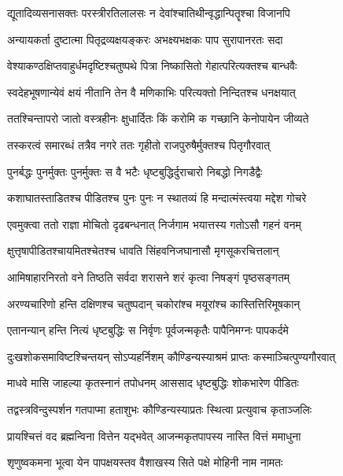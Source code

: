 {द्यूतादिव्यसनासक्तः परस्त्रीरतिलालसः}
{न देवांश्चातिथीन्वृद्धान्पितॄश्चा विजानपि} %

\twolineshloka
{अन्यायकर्ता दुष्टात्मा पितृद्रव्यक्षयङ्करः}
{अभक्ष्यभक्षकः पाप सुरापानरतः सदा} %

\twolineshloka
{वेश्याकण्ठक्षिप्तवाहुर्धमदृष्टिश्चतुष्पथे}
{पित्रा निष्कासितो गेहात्परित्यक्तश्च बान्धवैः} %

\twolineshloka
{स्वदेहभूषणान्येवं क्षयं नीतानि तेन वै}
{मणिकाभिः परित्यक्तो निन्दितश्च धनक्षयात्} %

\twolineshloka
{ततश्चिन्तापरो जातो वस्त्रहीनः क्षुधार्दितः}
{किं करोमि क गच्छानि केनोपायेन जीव्यते} %

\twolineshloka
{तस्करत्वं समारब्धं तत्रैव नगरे ततः}
{गृहीतो राजपुरुषैर्मुक्तश्च पितृगौरवात्} %

\twolineshloka
{पुनर्बद्धः पुनर्मुक्तः पुनर्मुक्तः स वै भटैः}
{धृष्टबुद्धिर्दुराचारो निबद्धो निगडैद्वैः} %

\twolineshloka
{कशाघातस्ताडितश्च पीडितश्च पुनः पुनः}
{न स्थातव्यं हि मन्दात्मंस्त्वया मद्देश गोचरे} %

\twolineshloka
{एवमुक्त्वा ततो राज्ञा मोचितो दृढबन्धनात्}
{निर्जगाम भयात्तस्य गतोऽसौ गहनं वनम्} %

\twolineshloka
{क्षुत्तृषापीडितश्चायमितश्चेतश्च धावति}
{सिंहवनिजघानासौ मृगसूकरचित्तलान्} %

\twolineshloka
{आमिषाहारनिरतो वने तिष्ठति सर्वदा}
{शरासने शरं कृत्वा निषङ्गं पृष्ठसङ्गतम्} %

\twolineshloka
{अरण्यचारिणो हन्ति दक्षिणश्च चतुष्पदान्}
{चकोरांश्च मयूरांश्च कास्तित्तिरिमूषकान्} %

\twolineshloka
{एतानन्यान् हन्ति नित्यं धृष्टबुद्धिः स निर्वृणः}
{पूर्वजन्मकृतैः पापैनिमग्नः पापकर्दमे} %

\twolineshloka
{दुःखशोकसमाविष्टश्चिन्तयन् सोऽप्यहर्निशम्}
{कौण्डिन्यस्याश्रमं प्राप्तः कस्माञ्चित्पुण्यगौरवात्} %

\twolineshloka
{माधवे मासि जाहल्या कृतस्नानं तपोधनम्}
{आससाद धृष्टबुद्धिः शोकभारेण पीडितः} %

\twolineshloka
{तद्वस्त्रविन्दुस्पर्शन गतपाप्मा हताशुभः}
{कौण्डिन्यस्याप्रतः स्थित्वा प्रत्युवाच कृताञ्जलिः} %


\twolineshloka
{प्रायश्चित्तं वद ब्रह्मन्विना वित्तेन यद्भवेत्}
{आजन्मकृतपापस्य नास्ति वित्तं ममाधुना} %


\twolineshloka
{शृणुष्वकमना भूत्वा येन पापक्षयस्तव}
{वैशाखस्य सिते पक्षे मोहिनी नाम नामतः} %

